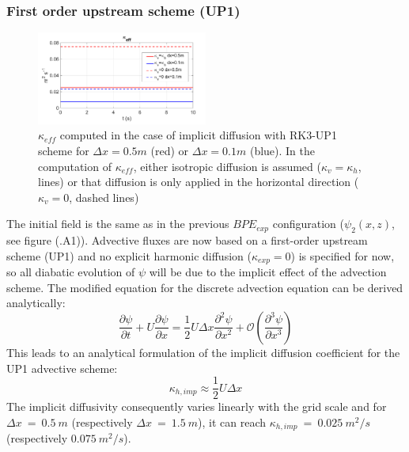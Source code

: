 \subsubsection{First order upstream scheme (UP1)}
\begin{figure}[h!]
\centering
\includegraphics[width=0.5\textwidth]{./CHAP_BPE/AGBPE_numlab3.png}
\caption{$\kappa_{eff}$ computed in the case of implicit diffusion with RK3-UP1 scheme for $\Delta x=0.5m$ (red) or $\Delta x=0.1m$ (blue). In the computation of $\kappa_{eff}$, either isotropic diffusion is assumed ($\kappa_v=\kappa_h$, lines) or that diffusion is only applied in the horizontal direction ($\kappa_v=0$, dashed lines)}
\label{fig3numlab}
\end{figure}
The initial field is the same as in the previous $BPE_{exp}$ configuration ($\psi_2(x,z)$, see figure (.A1)). Advective fluxes are now based on a first-order upstream scheme (UP1) and no explicit harmonic diffusion ($\kappa_{exp}=0$) is specified for now, so all diabatic evolution of $\psi$ will be due to the implicit effect of the advection scheme.
The modified equation for the discrete advection equation can be derived analytically:
\begin{equation}
\frac{\partial \psi}{\partial t}+U \frac{\partial \psi}{\partial x} = \frac{1}{2} U \Delta x  \frac{\partial^2 \psi}{\partial x^2} + \mathcal{O}(\frac{\partial^3 \psi}{\partial x^3})
\end{equation}
This leads to an analytical formulation of the implicit diffusion coefficient for the UP1 advective scheme: 
\begin{equation}
    \displaystyle
    \kappa_{h,imp}\approx\frac{1}{2}U \Delta x
\end{equation}
The implicit diffusivity consequently varies linearly with the grid scale and for $\Delta x\ =\ 0.5\ m$ (respectively $\Delta x\ =\ 1.5\ m$), it can reach $\kappa_{h,imp}\ =\ 0.025\ m^2/s$  (respectively $0.075\ m^2/s$).

